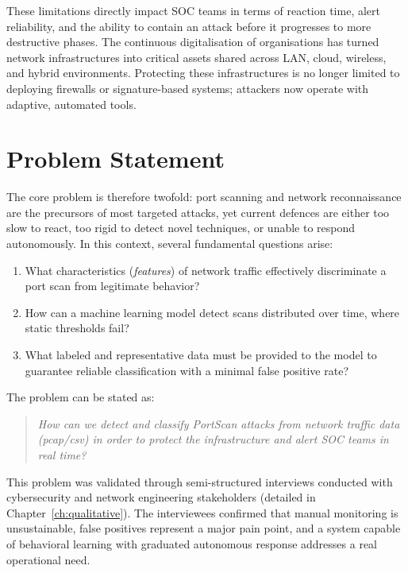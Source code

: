 \documentclass[12pt,a4paper]{report}
\begin{document}
These limitations directly impact SOC teams in terms of reaction time, alert reliability, and the ability to contain an attack before it progresses to more destructive phases. The continuous digitalisation of organisations has turned network infrastructures into critical assets shared across LAN, cloud, wireless, and hybrid environments. Protecting these infrastructures is no longer limited to deploying firewalls or signature-based systems; attackers now operate with adaptive, automated tools.

\section{Problem Statement}

The core problem is therefore twofold: port scanning and network reconnaissance are the precursors of most targeted attacks, yet current defences are either too slow to react, too rigid to detect novel techniques, or unable to respond autonomously. In this context, several fundamental questions arise:

\begin{enumerate}[nosep,leftmargin=1.5em]
  \item What characteristics (\textit{features}) of network traffic effectively discriminate a port scan from legitimate behavior?
  \item How can a machine learning model detect scans distributed over time, where static thresholds fail?
  \item What labeled and representative data must be provided to the model to guarantee reliable classification with a minimal false positive rate?
\end{enumerate}

\vspace{0.5em}
\noindent The problem can be stated as:

\begin{quote}
\itshape
\textit{How can we detect and classify PortScan attacks from network traffic data (pcap/csv) in order to protect the infrastructure and alert SOC teams in real time?}
\end{quote}

This problem was validated through semi-structured interviews conducted with cybersecurity and network engineering stakeholders (detailed in Chapter~\ref{ch:qualitative}). The interviewees confirmed that manual monitoring is unsustainable, false positives represent a major pain point, and a system capable of behavioral learning with graduated autonomous response addresses a real operational need.
\end{document}
